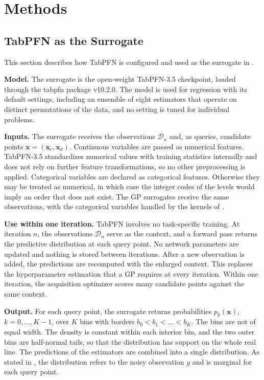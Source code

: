 
\chapter{Methods}\label{chap:methods}

\section{TabPFN as the Surrogate}

This section describes how TabPFN is configured and used as the surrogate in .

\textbf{Model.} The surrogate is the open-weight TabPFN-3.5 checkpoint, loaded through the tabpfn package v10.2.0. The model is used for regression with its default settings, including an ensemble of eight estimators that operate on distinct permutations of the data, and no setting is tuned for individual problems. %

\textbf{Inputs.} The surrogate receives the observations $\mathcal{D}_n$ and, as queries, candidate points $\boldsymbol{x} = (\boldsymbol{x}_c, \boldsymbol{x}_d)$. Continuous variables are passed as numerical features. TabPFN-3.5 standardizes numerical values with training statistics internally and does not rely on further feature transformations, so no other preprocessing is applied. Categorical variables are declared as categorical features. Otherwise they may be treated as numerical, in which case the integer codes of the levels would imply an order that does not exist. The GP surrogates receive the same observations, with the categorical variables handled by the kernels of .

\textbf{Use within one iteration.} TabPFN involves no task-specific training. At iteration $n$, the observations $\mathcal{D}_n$ serve as the context, and a forward pass returns the predictive distribution at each query point. No network parameters are updated and nothing is stored between iterations. After a new observation is added, the predictions are recomputed with the enlarged context. This replaces the hyperparameter estimation that a GP requires at every iteration. Within one iteration, the acquisition optimizer scores many candidate points against the same context. 

\textbf{Output.} For each query point, the surrogate returns probabilities $p_k(\boldsymbol{x})$, $k = 0, \dots, K-1$, over $K$ bins with borders $b_0 < b_1 < \dots < b_K$. The bins are not of equal width. The density is constant within each interior bin, and the two outer bins are half-normal tails, so that the distribution has support on the whole real line. The predictions of the estimators are combined into a single distribution. As stated in , the distribution refers to the noisy observation $y$ and is marginal for each query point.

